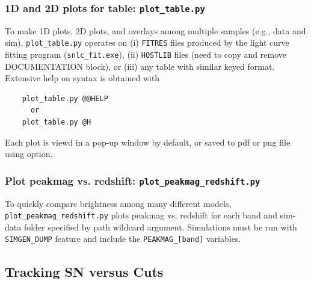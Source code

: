 \documentclass[12pt]{article}
\begin{document}
\subsubsection{1D and 2D plots for table: {\tt plot\_table.py} }
\label{sss:plot_table}

To make 1D plots, 2D plots, and overlays among multiple samples (e.g., data and sim),
{\tt plot\_table.py} operates on
(i) {\tt FITRES} files produced by the light curve
fitting program ({\tt snlc\_fit.exe}),
(ii) {\tt HOSTLIB} files
(need to copy and remove DOCUMENTATION block), or
(iii) any table with similar keyed format.
Extensive help on syntax is obtained with
\begin{verbatim}
    plot_table.py @@HELP
      or 
    plot_table.py @H
\end{verbatim}
%
Each plot is viewd in a pop-up window by default, or saved
to pdf or png file using {\tt \@\@SAVE} option.


\subsubsection{Plot peakmag vs. redshift: {\tt plot\_peakmag\_redshift.py} }
\label{sss:plot_peakmag}

To quickly compare brightness among many different models,
{\tt plot\_peakmag\_redshift.py} plots peakmag vs. redshift for each
band and sim-data folder specified by path wildcard argument.
Simulations must be run with {\tt SIMGEN\_DUMP} feature and include the
{\tt PEAKMAG\_[band]} variables.


   \clearpage
   \subsection{Tracking SN versus Cuts}
   \label{subsec:sncuts}
\end{document}
